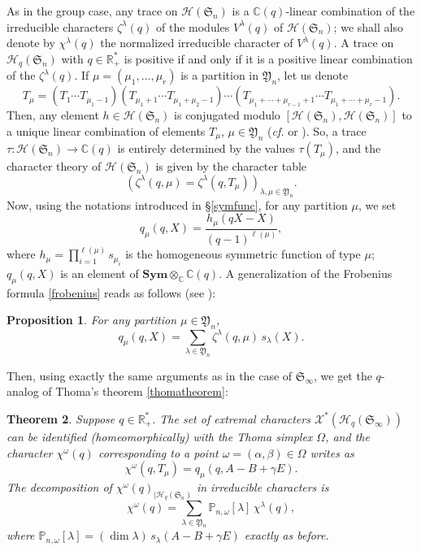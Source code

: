 \documentclass[smallextended,nospthms]{svjour3}
\newtheorem{theorem}{Theorem}
\newtheorem{proposition}[theorem]{Proposition}
\theoremstyle{remark}
\newcommand{\R}{\mathbb{R}}
\newcommand{\C}{\mathbb{C}}
\newcommand{\hecke}{\mathscr{H}}
\newcommand{\sym}{\mathfrak{S}}
\newcommand{\Sym}{\mathbf{Sym}}
\newcommand{\ym}{\mathfrak{Y}}
\newcommand{\proba}{\mathbb{P}}
\begin{document}
As in the group case, any trace on $\hecke(\sym_{n})$ is a $\C(q)$-linear combination of the irreducible characters $\zeta^{\lambda}(q)$ of the modules $V^{\lambda}(q)$ of $\hecke(\sym_{n})$; we shall also denote by $\chi^{\lambda}(q)$ the normalized irreducible character of $V^{\lambda}(q)$. A trace on $\hecke_{q}(\sym_{n})$ with $q \in \R_{+}^{*}$ is positive if and only if it is a positive linear combination of the $\zeta^{\lambda}(q)$.  If $\mu=(\mu_{1},\ldots,\mu_{r})$ is a partition in $\ym_{n}$, let us denote
$$
T_{\mu}=(T_{1}\cdots T_{\mu_{1}-1})(T_{\mu_{1}+1}\cdots T_{\mu_{1}+\mu_{2}-1})\cdots(T_{\mu_{1}+\cdots+\mu_{r-1}+1}\cdots T_{\mu_{1}+\cdots+\mu_{r}-1}).
$$
Then, any element $h \in \hecke(\sym_{n})$ is conjugated modulo $[\hecke(\sym_{n}),\hecke(\sym_{n})]$ to a unique linear combination of elements $T_{\mu}$, $\mu \in \ym_{n}$ (\emph{cf.} \cite[\S8.2]{GP00} or \cite[\S5]{Ram91}). So, a trace $\tau : \hecke(\sym_{n}) \to \C(q)$ is entirely determined by the values $\tau(T_{\mu})$, and the character theory of $\hecke(\sym_{n})$ is given by the character table
$$\left(\zeta^{\lambda}(q,\mu)=\zeta^{\lambda}(q,T_{\mu})\right)_{\lambda,\mu \in \ym_{n}}.$$
 Now, using the notations introduced in \S\ref{symfunc}, for any partition $\mu$, we set
$$q_{\mu}(q,X)=\frac{h_{\mu}(qX-X)}{(q-1)^{\ell(\mu)}},$$
where $h_{\mu}=\prod_{i=1}^{\ell(\mu)}s_{\mu_{i}}$ is the homogeneous symmetric function of type $\mu$; $q_{\mu}(q,X)$ is an element of $\Sym \otimes_{\C}\C(q)$.
 A generalization of the Frobenius formula \ref{frobenius} reads as follows (see \cite[Theorem 4.14]{Ram91}):
\begin{proposition}\label{qfrobenius}
For any partition $\mu \in \ym_{n}$,
$$q_{\mu}(q,X)=\sum_{\lambda \in \ym_{n}} \zeta^{\lambda}(q,\mu)\,s_{\lambda}(X) .$$
\end{proposition}\bigskip\bigskip


Then, using exactly the same arguments as in the case of $\sym_{\infty}$, we get the $q$-analog of Thoma's theorem \ref{thomatheorem}:
\begin{theorem}
Suppose $q\in \R_{+}^{*}$. The set of extremal characters $\mathcal{X}^{*}(\hecke_{q}(\sym_{\infty}))$ can be identified (homeomorphically) with the Thoma simplex $\Omega$, and the character $\chi^{\omega}(q)$ corresponding to a point $\omega=(\alpha,\beta) \in \Omega$ writes as
$$\chi^{\omega}(q,T_\mu)=q_{\mu}(q,A-B+\gamma E).$$
The decomposition of ${\chi^{\omega}(q)}_{|\hecke_{q}(\sym_{n})}$ in irreducible characters is
$$\chi^{\omega}(q)=\sum_{\lambda\in \ym_{n}}\proba_{n,\omega}[\lambda]\,\chi^{\lambda}(q),$$
where $\proba_{n,\omega}[\lambda]=(\dim\lambda)\,s_{\lambda}(A-B+\gamma E)$ exactly as before.
\end{theorem}\bigskip
\end{document}
